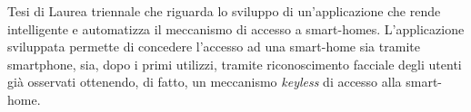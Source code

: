 \abstract
Tesi di Laurea triennale che riguarda lo sviluppo di un'applicazione che rende intelligente e automatizza il meccanismo di accesso a smart-homes. L'applicazione sviluppata permette di concedere l'accesso ad una smart-home sia tramite smartphone, sia, dopo i primi utilizzi, tramite riconoscimento facciale degli utenti già osservati ottenendo, di fatto, un meccanismo \textit{keyless} di accesso alla smart-home.